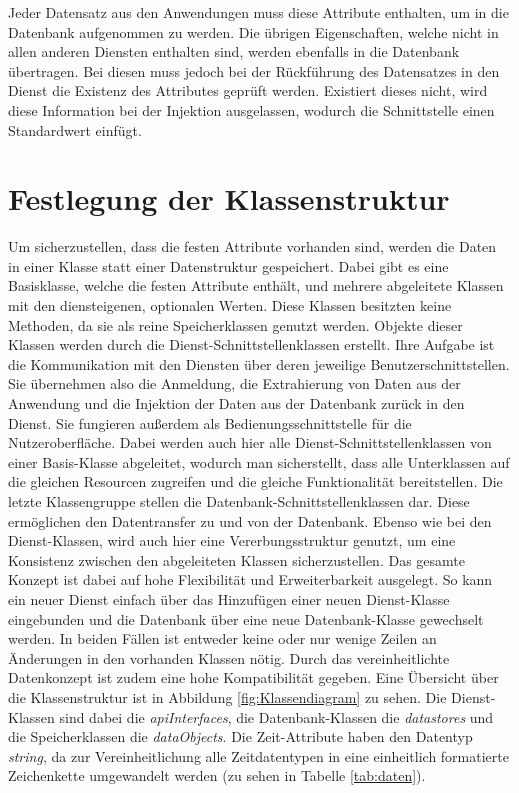 Jeder Datensatz aus den Anwendungen muss diese Attribute enthalten, um in die Datenbank aufgenommen zu werden. Die übrigen Eigenschaften, welche nicht in allen anderen Diensten enthalten sind, werden ebenfalls in die Datenbank übertragen. Bei diesen muss jedoch bei der Rückführung des Datensatzes in den Dienst die Existenz des Attributes geprüft werden. Existiert dieses nicht, wird diese Information bei der Injektion ausgelassen, wodurch die Schnittstelle einen Standardwert einfügt.

\section{Festlegung der Klassenstruktur}

Um sicherzustellen, dass die festen Attribute vorhanden sind, werden die Daten in einer Klasse statt einer Datenstruktur gespeichert. Dabei gibt es eine Basisklasse, welche die festen Attribute enthält, und mehrere abgeleitete Klassen mit den diensteigenen, optionalen Werten. Diese Klassen besitzten keine Methoden, da sie als reine Speicherklassen genutzt werden. Objekte dieser Klassen werden durch die Dienst-Schnittstellenklassen erstellt. Ihre Aufgabe ist die Kommunikation mit den Diensten über deren jeweilige Benutzerschnittstellen. Sie übernehmen also die Anmeldung, die Extrahierung von Daten aus der Anwendung und die Injektion der Daten aus der Datenbank zurück in den Dienst. Sie fungieren außerdem als Bedienungsschnittstelle für die Nutzeroberfläche. Dabei werden auch hier alle Dienst-Schnittstellenklassen von einer Basis-Klasse abgeleitet, wodurch man sicherstellt, dass alle Unterklassen auf die gleichen Resourcen zugreifen und die gleiche Funktionalität bereitstellen. Die letzte Klassengruppe stellen die Datenbank-Schnittstellenklassen dar. Diese ermöglichen den Datentransfer zu und von der Datenbank. Ebenso wie bei den Dienst-Klassen, wird auch hier eine Vererbungsstruktur genutzt, um eine Konsistenz zwischen den abgeleiteten Klassen sicherzustellen. Das gesamte Konzept ist dabei auf hohe Flexibilität und Erweiterbarkeit ausgelegt. So kann ein neuer Dienst einfach über das Hinzufügen einer neuen Dienst-Klasse eingebunden und die Datenbank über eine neue Datenbank-Klasse gewechselt werden. In beiden Fällen ist entweder keine oder nur wenige Zeilen an Änderungen in den vorhanden Klassen nötig. Durch das vereinheitlichte Datenkonzept ist zudem eine hohe Kompatibilität gegeben. Eine Übersicht über die Klassenstruktur ist in Abbildung \ref{fig:Klassendiagram} zu sehen. Die Dienst-Klassen sind dabei die \textit{apiInterfaces}, die Datenbank-Klassen die \textit{datastores} und die Speicherklassen die \textit{dataObjects}. Die Zeit-Attribute haben den Datentyp \textit{string}, da zur Vereinheitlichung alle Zeitdatentypen in eine einheitlich formatierte Zeichenkette umgewandelt werden (zu sehen in Tabelle \ref{tab:daten}).\\

